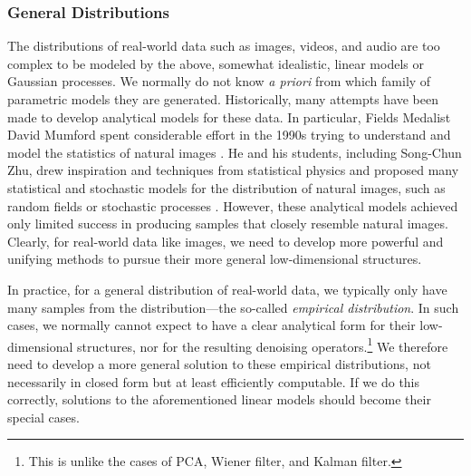 \documentclass[../../book-main.tex]{subfiles}
\begin{document}
\subsubsection{General Distributions}\label{sec:denoising-intro}

The distributions of real-world data such as images, videos, and audio are too complex to be modeled by the above, somewhat idealistic, linear models or Gaussian processes. We normally do not know \textit{a priori} from which family of parametric models they are generated. Historically, many attempts have been made to develop analytical models for these data. In particular, Fields Medalist David Mumford spent considerable effort in the 1990s trying to understand and model the statistics of natural images \cite{Mumford1996TheSD}. He and his students, including Song-Chun Zhu, drew inspiration and techniques from statistical physics and proposed many statistical and stochastic models for the distribution of natural images, such as random fields or stochastic processes \cite{Zhu-Entropy-1997,Zhu1997LearningGP,Zhu1997Prior,Huang-Mumford,Mumford-1999,Lee-Mumford}. However, these analytical models achieved only limited success in producing samples that closely resemble natural images. Clearly, for real-world data like images, we need to develop more powerful and unifying methods to pursue their more general low-dimensional structures.

In practice, for a general distribution of real-world data, we typically only have many samples from the distribution---the so-called \textit{empirical distribution}. In such cases, we normally cannot expect to have a clear analytical form for their low-dimensional structures, nor for the resulting denoising operators.\footnote{This is unlike the cases of PCA, Wiener filter, and Kalman filter.} We therefore need to develop a more general solution to these empirical distributions, not necessarily in closed form but at least efficiently computable. If we do this correctly, solutions to the aforementioned linear models should become their special cases.
\end{document}
